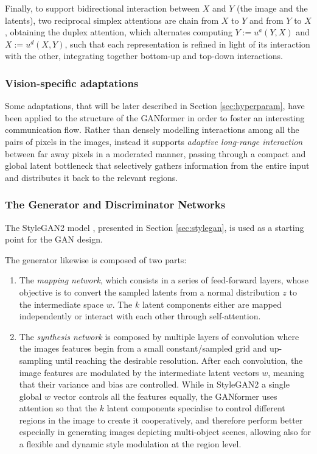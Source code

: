 \documentclass{article}
\begin{document}
	Finally, to support bidirectional interaction between $X$ and $Y$ (the image and the latents), two 
	reciprocal simplex attentions are chain from $X$ to $Y$ and from $Y$ to $X$, obtaining the duplex 
	attention, which alternates computing $Y :=u^a(Y,X)$ and $X:=u^d(X,Y)$, such that each 
	representation is refined in light of its interaction with the other, integrating together bottom-up and 
	top-down interactions.
	
	\subsubsection{Vision-specific adaptations}%
	Some adaptations, that will be later described in Section \ref{sec:hyperparam}, have been applied to 
	the structure of the GANformer in order to foster an interesting communication flow. Rather than 
	densely modelling interactions among all the pairs of pixels in the images, instead it supports 
	\textit{adaptive long-range interaction} between far away pixels in a moderated manner, passing 
	through a compact and global latent bottleneck that selectively gathers information from the entire 
	input and distributes it back to the relevant regions. 
	
	\subsubsection{The Generator and Discriminator Networks}
	The StyleGAN2 model \cite{karras2019style, karras2020analyzing}, presented in Section 
	\ref{sec:stylegan}, is used as a starting point for the GAN design. 
		

	The generator likewise is composed of two parts:
	\begin{enumerate}
		\item The \textit{mapping network}, which consists in a series of feed-forward layers, whose 
		objective is to convert the sampled latents from a normal distribution $z$ to the intermediate 
		space $w$. The $k$ latent components either are mapped independently or interact with each 
		other through self-attention.
		\item The \textit{synthesis network} is composed by multiple layers of convolution where the 
		images features begin from a small constant/sampled grid and up-sampling until reaching the 
		desirable resolution.
		After each convolution, the image features are modulated by the intermediate latent vectors $w$, 
		meaning that their variance and bias are controlled. 
		While in StyleGAN2 a single global $w$ vector controls all the features equally, the GANformer 
		uses attention so that the $k$ latent components specialise to control different regions in the 
		image to create it cooperatively, and therefore perform better especially in generating images 
		depicting multi-object scenes, allowing also for a flexible and dynamic style modulation at the 
		region level.
	\end{enumerate}
\end{document}

